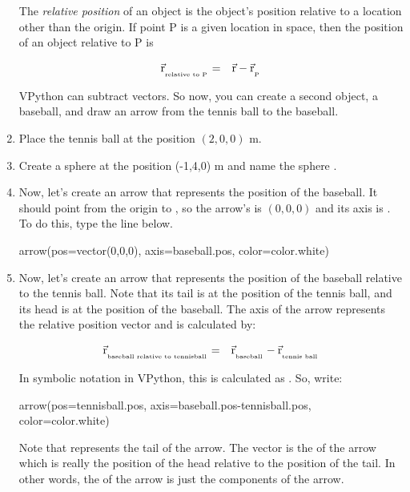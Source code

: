 \begin{enumerate}
The \emph{relative position} of an object is the object's position relative to a location other than the origin. If point P is a given location in space, then the position of an object relative to P is

\begin{eqnarray*}
	\vec{\mathrm{r}}_{_{_{\mbox{\tiny{relative to P}}}}} & = & \vec{\mathrm{r}} - \vec{\mathrm{r}}_{_{_{\mbox{\tiny{P}}}}} \\
\end{eqnarray*}

VPython can subtract vectors. So now, you can create a second object, a baseball, and draw an arrow from the tennis ball to the baseball.

\item Place the tennis ball at the position $(2,0,0)$ m. 

\item Create a sphere at the position (-1,4,0) m and name the sphere .

\item Now, let's create an arrow that represents the position of the baseball. It should point from the origin to , so the arrow's  is $(0,0,0)$ and its axis is . To do this, type the line below.

\begin{myvpython}
arrow(pos=vector(0,0,0), axis=baseball.pos, color=color.white)
\end{myvpython}

\item Now, let's create an arrow that represents the position of the baseball relative to the tennis ball. Note that its tail is at the position of the tennis ball, and its head is at the position of the baseball. The axis of the arrow represents the relative position vector and is calculated by:

\begin{eqnarray*}
	\vec{\mathrm{r}}_{_{_{\mbox{\tiny{baseball relative to tennisball}}}}} & = & \vec{\mathrm{r}}_{_{_{\mbox{\tiny{baseball}}}}} - \vec{\mathrm{r}}_{_{_{\mbox{\tiny{tennis ball}}}}} \\
\end{eqnarray*}

In symbolic notation in VPython, this is calculated as . So, write:

\begin{vpythonblock}
arrow(pos=tennisball.pos, axis=baseball.pos-tennisball.pos, color=color.white)
\end{vpythonblock}

Note that  represents the tail of the arrow. The vector is the  of the arrow which is really the position of the head relative to the position of the tail. In other words, the  of the arrow is just the components of the arrow.

\end{enumerate}

